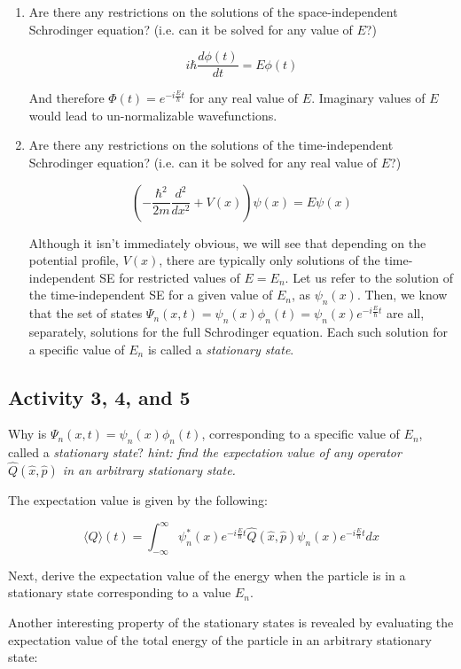 \documentclass{article}
\begin{document}
\begin{enumerate}
    \item Are there any restrictions on the solutions of the space-independent Schrodinger equation? (i.e. can it be solved for any value of $E$?)
    
    $$i \hbar \frac{d \phi(t)}{dt} = E \phi(t)$$
    
    And therefore $\Phi(t) = e^{-i \frac{E}{\hbar} t}$ for any real value of $E$. Imaginary values of $E$ would lead to un-normalizable wavefunctions. 
    
    \item Are there any restrictions on the solutions of the time-independent Schrodinger equation? (i.e. can it be solved for any real value of $E$?)
    
    $$\left( - \frac{\hbar^2}{2m} \frac{d^2}{dx^2} + V(x) \right) \psi(x) = E \psi(x)$$
    
    Although it isn't immediately obvious, we will see that depending on the potential profile, $V(x)$, there are typically only solutions of the time-independent SE for restricted values of $E = E_n$. Let us refer to the solution of the time-independent SE for a given value of $E_n$, as $\psi_n(x)$. Then, we know that the set of states $\Psi_n(x,t) = \psi_n(x) \phi_n(t) = \psi_n(x) e^{-i \frac{E}{\hbar} t}$ are all, separately, solutions for the full Schrodinger equation. Each such solution for a specific value of $E_n$ is called a \textit{stationary state}.
\end{enumerate}

\subsection{Activity 3, 4, and 5}

Why is $\Psi_n(x,t) = \psi_n(x) \phi_n(t)$, corresponding to a specific value of $E_n$, called a \textit{stationary state}? \textit{hint: find the expectation value of any operator $\hat{Q} (\hat x , \hat p)$ in an arbitrary stationary state.}

The expectation value is given by the following:

$$\langle Q \rangle (t) = \int_{- \infty}^\infty \psi^*_n(x) e^{-i \frac{E}{\hbar} t } \hat Q (\hat x, \hat p) \psi_n(x) e^{-i \frac{E}{\hbar} t } dx$$

Next, derive the expectation value of the energy when the particle is in a stationary state corresponding to a value $E_n$. 


Another interesting property of the stationary states is revealed by evaluating the expectation value of the total energy of the particle in an arbitrary stationary state:
\end{document}
